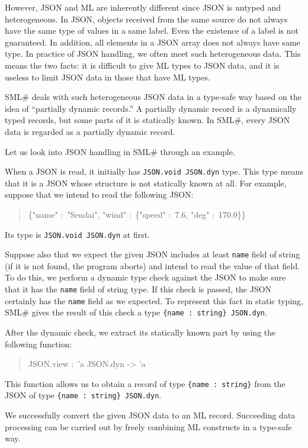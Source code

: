 \documentclass{jbook}
\newcommand{\smlsharp}{SML\#}
\newenvironment{program}{\begin{quote}\begin{tt}}%
                        {\end{tt}\end{quote}}
\begin{document}
	However, JSON and ML are inherently different since
JSON is untyped and heterogeneous.
	In JSON,
objects received from the same source do not always have the same type
of values in a same label.
	Even the existence of a label is not guaranteed.
	In addition, all elements in a JSON array does not always have
same type.
	In practice of JSON handling, we often meet such heterogeneous
data.
	This means the two facts:
it is difficult to give ML types to JSON data, and
it is useless to limit JSON data in those that have ML types.

	\smlsharp{} deals with such heterogeneous JSON data in a
type-safe way based on the idea of ``partially dynamic records.''
	A partially dynamic record is
a dynamically typed records, but some parts of it
is statically known.
	In \smlsharp{}, every JSON data is regarded as a
partially dynamic record.

	Let us look into JSON handling in \smlsharp{} through an example.

	When a JSON is read, it initially has {\tt JSON.void JSON.dyn} type.
	This type means that
it is a JSON whose structure is not statically known at all.
	For example, suppose that we intend to read the following JSON:
\begin{program}
\{"name" :\ "Sendai",
  "wind" :\ \{"speed" :\ 7.6, "deg" :\ 170.0\}\}
\end{program}
	Its type is {\tt JSON.void JSON.dyn} at first.

	Suppose also that
we expect the given JSON includes at least {\tt name} field of string
(if it is not found, the program aborts)
and intend to read the value of that field.
	To do this,
we perform a dynamic type check against the JSON to make sure that
it has the {\tt name} field of string type.
	If this check is passed,
the JSON certainly has the {\tt name} field as we expected.
	To represent this fact in static typing,
\smlsharp{} gives the result of this check
a type {\tt \{name :\ string\} JSON.dyn}.

	After the dynamic check,
we extract its statically known part by using the following function:
\begin{program}
JSON.view :\ 'a JSON.dyn -> 'a
\end{program}
        This function allows us to obtain a record of type
{\tt \{name :\ string\}} from the JSON of type
{\tt \{name :\ string\} JSON.dyn}.

	We successfully convert the given JSON data to an ML record.
	Succeeding data processing can be carried out by freely
combining ML constructs in a type-safe way.
\end{document}
